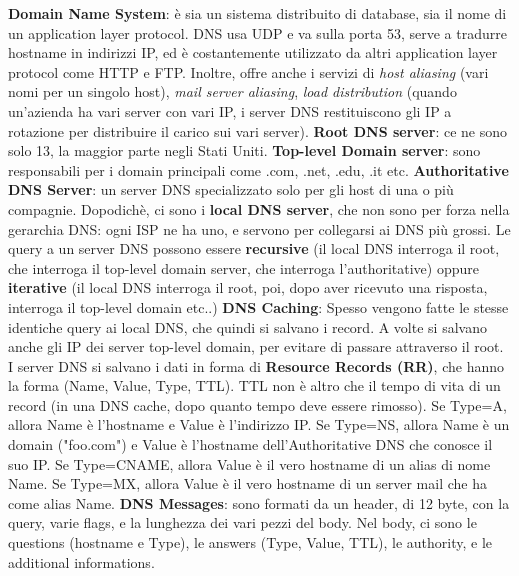 \documentclass[a4paper,10pt]{article} %
\renewcommand{\b}[1]{%
    {\textbf{#1}}}
\begin{document}
\b{Domain Name System}: è sia un sistema distribuito di database, sia il nome di un application layer protocol. DNS usa UDP e va sulla porta 53, serve a tradurre hostname in indirizzi IP, ed è costantemente utilizzato da altri application layer protocol come HTTP e FTP. Inoltre, offre anche i servizi di \emph{host aliasing} (vari nomi per un singolo host), \emph{mail server aliasing}, \emph{load distribution} (quando un'azienda ha vari server con vari IP, i server DNS restituiscono gli IP a rotazione per distribuire il carico sui vari server).
\b{Root DNS server}: ce ne sono solo 13, la maggior parte negli Stati Uniti.
\b{Top-level Domain server}: sono responsabili per i domain principali come .com, .net, .edu, .it etc.
\b{Authoritative DNS Server}: un server DNS specializzato solo per gli host di una o più compagnie.
Dopodichè, ci sono i \b{local DNS server}, che non sono per forza nella gerarchia DNS: ogni ISP ne ha uno, e servono per collegarsi ai DNS più grossi.
Le query a un server DNS possono essere \b{recursive} (il local DNS interroga il root, che interroga il top-level domain server, che interroga l'authoritative) oppure \b{iterative} (il local DNS interroga il root, poi, dopo aver ricevuto una risposta, interroga il top-level domain etc..)
\b{DNS Caching}: Spesso vengono fatte le stesse identiche query ai local DNS, che quindi si salvano i record. A volte si salvano anche gli IP dei server top-level domain, per evitare di passare attraverso il root.
I server DNS si salvano i dati in forma di \b{Resource Records (RR)}, che hanno la forma (Name, Value, Type, TTL). TTL non è altro che il tempo di vita di un record (in una DNS cache, dopo quanto tempo deve essere rimosso). Se Type=A, allora Name è l'hostname e Value è l'indirizzo IP. Se Type=NS, allora Name è un domain ("foo.com") e Value è l'hostname dell'Authoritative DNS che conosce il suo IP.  Se Type=CNAME, allora Value è il vero hostname di un alias di nome Name. Se Type=MX, allora Value è il vero hostname di un server mail che ha come alias Name.
\b{DNS Messages}: sono formati da un header, di 12 byte, con la query, varie flags, e la lunghezza dei vari pezzi del body. Nel body, ci sono le questions (hostname e Type), le answers (Type, Value, TTL), le authority, e le additional informations.
\end{document}
